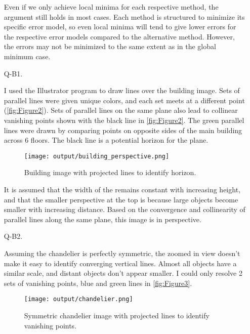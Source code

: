 \documentclass[12pt]{report}
\begin{document}
\begin{enumerate}
    Even if we only achieve local minima for each respective method, the argument still holds in most cases. Each method is structured to minimize its specific 
    error model, so even local minima will tend to give lower errors for the respective error models compared to the alternative method. However, the errors 
    may not be minimized to the same extent as in the global minimum case.

    \item[Q-B1.]

    I used the Illustrator program to draw lines over the building image. Sets of parallel lines were given unique colors, and each set meets at a different 
    point (\autoref{fig:Figure2}). Sets of parallel lines on the same plane also lead to collinear vanishing points shown with the black line in 
    \autoref{fig:Figure2}. The green parallel lines were drawn by comparing points on opposite sides of the main building across 6 floors. The black line is a 
    potential horizon for the plane.

    \begin{figure}[H]
        \centering
        \texttt{[image: output/building\_perspective.png]}
        \caption{Building image with projected lines to identify horizon.}
        \label{fig:Figure2}
    \end{figure}

    \FloatBarrier 

    It is assumed that the width of the remains constant with increasing height, and that the smaller perspective at the top is because large objects become 
    smaller with increasing distance. Based on the convergence and collinearity of parallel lines along the same plane, this image is in perspective. 

    \item[Q-B2.]

    Assuming the chandelier is perfectly symmetric, the zoomed in view doesn't make it easy to identify converging vertical lines. Almost all objects have a 
    similar scale, and distant objects don't appear smaller. I could only resolve 2 sets of vanishing points, blue and green lines in \autoref{fig:Figure3}.

    \begin{figure}[H]
        \centering
        \texttt{[image: output/chandelier.png]}
        \caption{Symmetric chandelier image with projected lines to identify vanishing points.}
        \label{fig:Figure3}
    \end{figure}


\end{enumerate}
\end{document}
